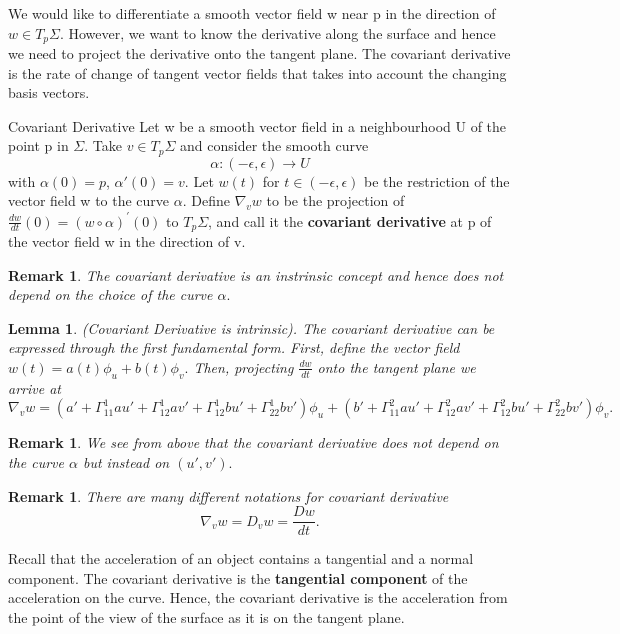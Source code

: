 \documentclass[twoside]{article}
\newtheorem{lemma}[theorem]{Lemma}
\newtheorem{remark}[theorem]{Remark}
\begin{document}
We would like to differentiate a smooth vector field w near p in the direction of $w \in T_p\Sigma$. However, we want to know the derivative along the surface and hence we need to project the derivative onto the tangent plane. The covariant derivative is the rate of change of tangent vector fields that takes into account the changing basis vectors.

\begin{definition_exam}{Covariant Derivative}{} Let w be a smooth vector field in a neighbourhood U of the point p in $\Sigma$. Take $v \in T_p\Sigma$ and consider the smooth curve 
$$
\alpha: (-\epsilon, \epsilon) \rightarrow U
$$
with $\alpha(0) = p$, $\alpha'(0) = v.$ Let $w(t)$ for $t \in (-\epsilon, \epsilon)$ be the restriction of the vector field w to the curve $\alpha.$
Define $\nabla_vw$ to be the projection of $\frac{dw}{dt}(0) = (w \circ \alpha)^{'}(0)$ to $T_p\Sigma$, and call it the \textbf{covariant derivative} at p of the vector field w in the direction of v.
\end{definition_exam}


\begin{remark}The covariant derivative is an instrinsic concept and hence does not depend on the choice of the curve $\alpha.$
\end{remark}

\begin{lemma}(Covariant Derivative is intrinsic). The covariant derivative can be expressed through the first fundamental form. First, define the vector field $w(t) = a(t)\phi_u + b(t)\phi_v.$ Then, projecting $\frac{dw}{dt}$ onto the tangent plane we arrive at
$$
\nabla_vw = (a' + \Gamma_{11}^{1}au' + \Gamma_{12}^{1}av' + \Gamma_{12}^{1}bu'+ \Gamma_{22}^{1}bv')\phi_u + (b' + \Gamma_{11}^{2}au' + \Gamma_{12}^{2}av' + \Gamma_{12}^{2}bu' + \Gamma_{22}^{2}bv')\phi_v. 
$$
\end{lemma}

\begin{remark}We see from above that the covariant derivative does not depend on the curve $\alpha$ but instead on $(u',v').$
\end{remark}

\begin{remark}There are many different notations for covariant derivative 
$$
\nabla_vw = D_vw = \frac{Dw}{dt}.
$$
\end{remark}

Recall that the acceleration of an object contains a tangential and a normal component. The covariant derivative is the \textbf{tangential component} of the acceleration on the curve. Hence, the covariant derivative is the acceleration from the point of the view of the surface as it is on the tangent plane.
\end{document}
